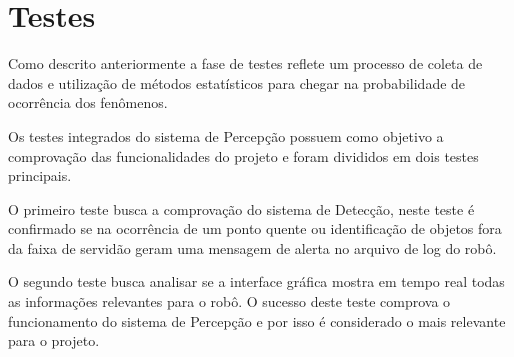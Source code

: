 \section{Testes}
Como descrito anteriormente a fase de testes reflete um processo de coleta de dados e utilização de métodos estatísticos para chegar na probabilidade de ocorrência dos fenômenos.  

Os testes integrados do sistema de Percepção possuem como objetivo a comprovação das funcionalidades do projeto e foram divididos em dois testes principais.

O primeiro teste busca a comprovação do sistema de Detecção, neste teste é confirmado se na ocorrência de um ponto quente ou identificação de objetos fora da faixa de servidão geram uma mensagem de alerta no arquivo de log do robô.

O segundo teste busca analisar se a interface gráfica mostra em tempo real todas as informações relevantes para o robô. O sucesso deste teste comprova o funcionamento do sistema de Percepção e por isso é considerado o mais relevante para o projeto.
 